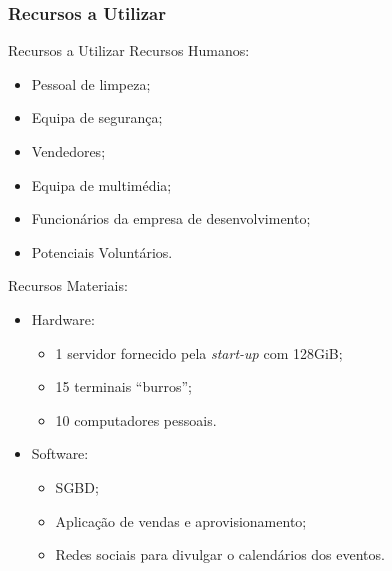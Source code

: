 \documentclass[compress,svgnames,handout,13.7pt]{beamer}
\begin{document}
\subsubsection{Recursos a Utilizar}
\begin{frame}{Recursos a Utilizar}
Recursos Humanos:
\begin{itemize}
               \item Pessoal de limpeza;
               \item Equipa de seguran\c{c}a;
               \item Vendedores;
               \item Equipa de multim\'edia;
               \item Funcion\'{a}rios da empresa de desenvolvimento;
               \item Potenciais Volunt\'arios.
             \end{itemize}
Recursos Materiais:
\begin{itemize}
             \item{Hardware:}
               \begin{itemize}
                 \item 1 servidor fornecido pela \textit{start-up} com 128GiB;
                 \item 15 terminais ``burros'';
                 \item 10 computadores pessoais.
               \end{itemize}
             \item{Software:}
               \begin{itemize}
                 \item SGBD;
                 \item Aplicação de vendas e aprovisionamento;
                 \item Redes sociais para divulgar o calendários dos eventos.
               \end{itemize}
             \end{itemize}
\end{frame}
\end{document}
